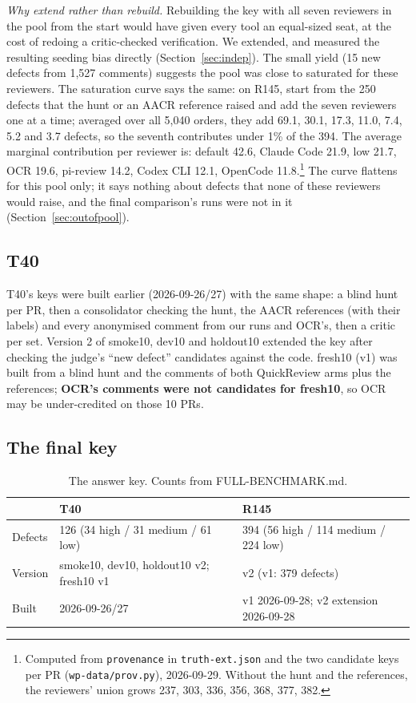 \documentclass[11pt,a4paper]{article}
\newcommand{\qcr}{QuickReview}
\newcommand{\code}[1]{\texttt{#1}}
\begin{document}
\emph{Why extend rather than rebuild.} Rebuilding the key with all seven
reviewers in the pool from the start would have given every tool an
equal-sized seat, at the cost of redoing a critic-checked verification. We
extended, and measured the resulting seeding bias directly
(Section~\ref{sec:indep}). The small yield (15 new defects from 1{,}527
comments) suggests the pool was close to saturated for these reviewers.
The saturation curve says the same: on R145, start from the 250 defects
that the hunt or an AACR reference raised and add the seven reviewers one at
a time; averaged over all 5{,}040 orders, they add 69.1, 30.1, 17.3, 11.0,
7.4, 5.2 and 3.7 defects, so the seventh contributes under 1\% of the 394.
The average marginal contribution per reviewer is: default 42.6, Claude
Code 21.9, low 21.7, OCR 19.6, pi-review 14.2, Codex CLI 12.1, OpenCode
11.8.\footnote{Computed from \code{provenance} in \code{truth-ext.json} and
the two candidate keys per PR (\code{wp-data/prov.py}), 2026-09-29. Without
the hunt and the references, the reviewers' union grows 237, 303, 336, 356,
368, 377, 382.} The curve flattens for this pool only; it says nothing about
defects that none of these reviewers would raise, and the final comparison's
runs were not in it (Section~\ref{sec:outofpool}).

\subsection{T40}
\label{sec:gt40}

T40's keys were built earlier (2026-09-26/27) with the same shape: a blind
hunt per PR, then a consolidator checking the hunt, the AACR references
(with their labels) and every anonymised comment from our runs and OCR's,
then a critic per set. Version 2 of smoke10, dev10 and holdout10 extended
the key after checking the judge's ``new defect'' candidates against the
code. fresh10 (v1) was built from a blind hunt and
the comments of both \qcr{} arms plus the references; \textbf{OCR's comments
were not candidates for fresh10}, so OCR may be under-credited on those 10
PRs.

\subsection{The final key}

\begin{table}[tbp]
  \centering
  \caption{The answer key. Counts from FULL-BENCHMARK.md.}
  \label{tab:gt}
  \small
  \begin{tabular}{lll}
    \toprule
     & T40 & R145 \\
    \midrule
    Defects & 126 (34 high / 31 medium / 61 low) & 394 (56 high / 114 medium / 224 low) \\
    Version & smoke10, dev10, holdout10 v2; fresh10 v1 & v2 (v1: 379 defects) \\
    Built & 2026-09-26/27 & v1 2026-09-28; v2 extension 2026-09-28 \\
    \bottomrule
  \end{tabular}
\end{table}
\end{document}
